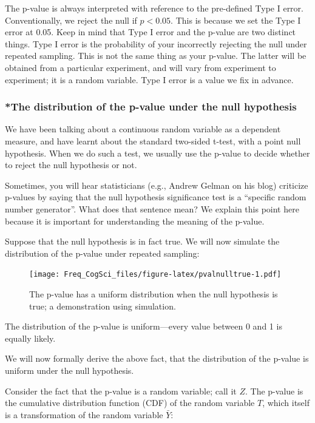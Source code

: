 \documentclass[12pt,]{krantz}
\begin{document}
The p-value is always interpreted with reference to the pre-defined Type I error. Conventionally, we reject the null if \(p<0.05\). This is because we set the Type I error at 0.05. Keep in mind that Type I error and the p-value are two distinct things.
Type I error is the probability of your incorrectly rejecting the null under repeated sampling. This is not the same thing as your p-value. The latter will be obtained from a particular experiment, and will vary from experiment to experiment; it is a random variable. Type I error is a value we fix in advance.

\hypertarget{the-distribution-of-the-p-value-under-the-null-hypothesis}{%
\subsubsection{*The distribution of the p-value under the null hypothesis}\label{the-distribution-of-the-p-value-under-the-null-hypothesis}}

We have been talking about a continuous random variable as a dependent measure, and have learnt about the standard two-sided t-test, with a point null hypothesis. When we do such a test, we usually use the p-value to decide whether to reject the null hypothesis or not.

Sometimes, you will hear statisticians (e.g., Andrew Gelman on his blog) criticize p-values by saying that the null hypothesis significance test is a ``specific random number generator''. What does that sentence mean? We explain this point here because it is important for understanding the meaning of the p-value.

Suppose that the null hypothesis is in fact true. We will now simulate the distribution of the p-value under repeated sampling:

\begin{figure}
\centering
\texttt{[image: Freq\_CogSci\_files/figure-latex/pvalnulltrue-1.pdf]}
\caption{\label{fig:pvalnulltrue}The p-value has a uniform distribution when the null hypothesis is true; a demonstration using simulation.}
\end{figure}

The distribution of the p-value is uniform---every value between 0 and 1 is equally likely.

We will now formally derive the above fact, that the distribution of the p-value is uniform under the null hypothesis.

Consider the fact that the p-value is a random variable; call it \(Z\). The p-value is the cumulative distribution function (CDF) of the random variable \(T\), which itself is a transformation of the random variable \(\bar{Y}\):
\end{document}
